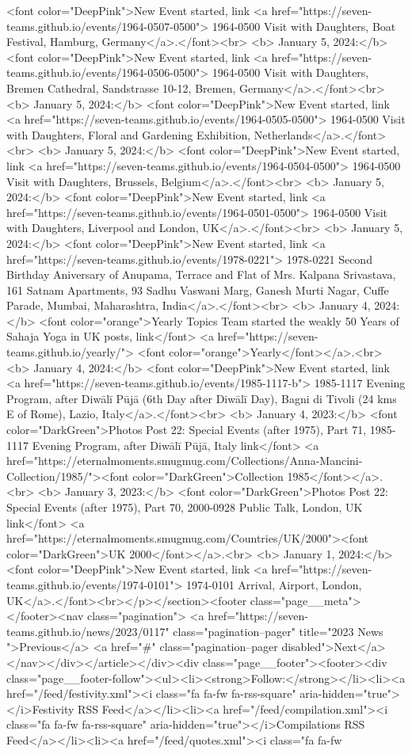 <font color="DeepPink">New Event started, link <a href="https://seven-teams.github.io/events/1964-0507-0500"> 1964-0500 Visit with Daughters, Boat Festival, Hamburg, Germany</a>.</font><br> <b> January 5, 2024:</b> <font color="DeepPink">New Event started, link <a href="https://seven-teams.github.io/events/1964-0506-0500"> 1964-0500 Visit with Daughters, Bremen Cathedral, Sandstrasse 10-12, Bremen, Germany</a>.</font><br> <b> January 5, 2024:</b> <font color="DeepPink">New Event started, link <a href="https://seven-teams.github.io/events/1964-0505-0500"> 1964-0500 Visit with Daughters, Floral and Gardening Exhibition, Netherlands</a>.</font><br> <b> January 5, 2024:</b> <font color="DeepPink">New Event started, link <a href="https://seven-teams.github.io/events/1964-0504-0500"> 1964-0500 Visit with Daughters, Brussels, Belgium</a>.</font><br> <b> January 5, 2024:</b> <font color="DeepPink">New Event started, link <a href="https://seven-teams.github.io/events/1964-0501-0500"> 1964-0500 Visit with Daughters, Liverpool and London, UK</a>.</font><br> <b> January 5, 2024:</b> <font color="DeepPink">New Event started, link <a href="https://seven-teams.github.io/events/1978-0221"> 1978-0221 Second Birthday Aniversary of Anupama, Terrace and Flat of Mrs. Kalpana Srivastava, 161 Satnam Apartments, 93 Sadhu Vaswani Marg, Ganesh Murti Nagar, Cuffe Parade, Mumbai, Maharashtra, India</a>.</font><br> <b> January 4, 2024:</b> <font color="orange">Yearly Topics Team started the weakly 50 Years of Sahaja Yoga in UK posts, link</font> <a href="https://seven-teams.github.io/yearly/"> <font color="orange">Yearly</font></a>.<br> <b> January 4, 2024:</b> <font color="DeepPink">New Event started, link <a href="https://seven-teams.github.io/events/1985-1117-b"> 1985-1117 Evening Program, after Diwālī Pūjā (6th Day after Diwālī Day), Bagni di Tivoli (24 kms E of Rome), Lazio, Italy</a>.</font><br> <b> January 4, 2023:</b> <font color="DarkGreen">Photos Post 22: Special Events (after 1975), Part 71, 1985-1117 Evening Program, after Diwālī Pūjā, Italy link</font> <a href="https://eternalmoments.smugmug.com/Collections/Anna-Mancini-Collection/1985/"><font color="DarkGreen">Collection 1985</font></a>.<br> <b> January 3, 2023:</b> <font color="DarkGreen">Photos Post 22: Special Events (after 1975), Part 70, 2000-0928 Public Talk, London, UK link</font> <a href="https://eternalmoments.smugmug.com/Countries/UK/2000"><font color="DarkGreen">UK 2000</font></a>.<br> <b> January 1, 2024:</b> <font color="DeepPink">New Event started, link <a href="https://seven-teams.github.io/events/1974-0101"> 1974-0101 Arrival, Airport, London, UK</a>.</font><br></p></section><footer class="page__meta"></footer><nav class="pagination"> <a href="https://seven-teams.github.io/news/2023/0117" class="pagination--pager" title="2023 News ">Previous</a> <a href="#" class="pagination--pager disabled">Next</a></nav></div></article></div><div class="page__footer"><footer><div class="page__footer-follow"><ul><li><strong>Follow:</strong></li><li><a href="/feed/festivity.xml"><i class="fa fa-fw fa-rss-square" aria-hidden="true"></i>Festivity RSS Feed</a></li><li><a href="/feed/compilation.xml"><i class="fa fa-fw fa-rss-square" aria-hidden="true"></i>Compilations RSS Feed</a></li><li><a href="/feed/quotes.xml"><i class="fa fa-fw 